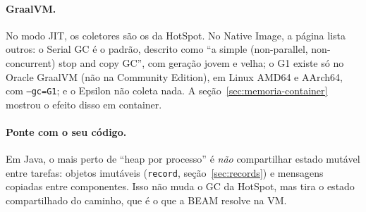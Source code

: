 \paragraph{GraalVM.}
No modo JIT, os coletores são os da HotSpot. No Native Image, a página
 lista outros: o Serial GC é o padrão,
descrito como \enquote{a simple (non-parallel, non-concurrent) stop and
copy GC}, com geração jovem e velha; o G1 existe só no Oracle GraalVM
(não na Community Edition), em Linux AMD64 e AArch64, com
\texttt{--gc=G1}; e o Epsilon não coleta nada. A
seção~\ref{sec:memoria-container} mostrou o efeito disso em container.

\paragraph{Ponte com o seu código.}
Em Java, o mais perto de \enquote{heap por processo} é \emph{não}
compartilhar estado mutável entre tarefas: objetos imutáveis
(\texttt{record}, seção~\ref{sec:records}) e mensagens copiadas entre
componentes. Isso não muda o GC da HotSpot, mas tira o estado
compartilhado do caminho, que é o que a BEAM resolve na VM.
